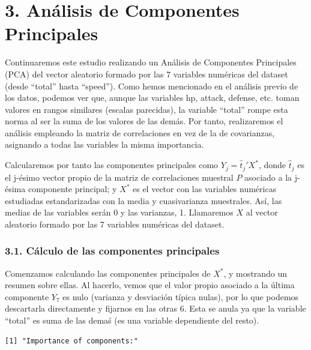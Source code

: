 \documentclass[
  11.8pt,
]{extreport}
\begin{document}
\chapter{3. Análisis de Componentes
Principales}\label{anuxe1lisis-de-componentes-principales}

Continuaremos este estudio realizando un Análisis de Componentes
Principales (PCA) del vector aleatorio formado por las 7 variables
numéricas del dataset (desde ``total'' hasta ``speed''). Como hemos
mencionado en el análisis previo de los datos, podemos ver que, aunque
las variables hp, attack, defense, etc. toman valores en rangos
similares (escalas parecidas), la variable ``total'' rompe esta norma al
ser la suma de los valores de las demás. Por tanto, realizaremos el
análisis empleando la matriz de correlaciones en vez de la de
covarianzas, asignando a todas las variables la misma importancia.

Calcularemos por tanto las componentes principales como
\(Y_j = \hat{t}_j'X^*\), donde \(\hat{t}_j\) es el j-ésimo vector propio
de la matriz de correlaciones muestral \(P\) asociado a la j-ésima
componente principal; y \(X^*\) es el vector con las variables numéricas
estudiadas estandarizadas con la media y cuasivarianza muestrales. Así,
las medias de las variables serán 0 y las varianzas, 1. Llamaremos \(X\)
al vector aleatorio formado por las 7 variables numéricas del dataset.

\subsection{3.1. Cálculo de las componentes
principales}\label{cuxe1lculo-de-las-componentes-principales}

Comenzamos calculando las componentes principales de \(X^*\), y
mostrando un resumen sobre ellas. Al hacerlo, vemos que el valor propio
asociado a la última componente \(Y_7\) es nulo (varianza y desviación
típica nulas), por lo que podemos descartarla directamente y fijarnos en
las otras 6. Esta se anula ya que la variable ``total'' es suma de las
demaś (es una variable dependiente del resto).

\begin{verbatim}
[1] "Importance of components:"
\end{verbatim}
\end{document}
